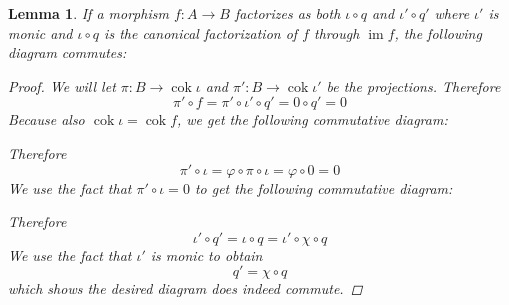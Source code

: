 \documentclass{article}
\DeclareMathOperator{\im}{\mathrm{im}}
\DeclareMathOperator{\cok}{\mathrm{cok}}
\newtheorem{lemma}[theorem]{Lemma}
\begin{document}
\begin{lemma}\label{lem:double factorization through im}
    If a morphism $f:A\to B$ factorizes as both $\iota \circ q$ and $\iota'\circ q'$ where $\iota'$ is monic and $\iota \circ q$ is the canonical factorization of $f$ through $\im f$, the following diagram commutes:
    \begin{center}
    \end{center}
    \cite{FIT}
    \begin{proof}
        We will let $\pi:B\to \cok \iota$ and $\pi':B\to \cok \iota'$ be the projections. Therefore
        \[
        \pi'\circ f=\pi'\circ \iota'\circ q'=0\circ q'=0
        \]
        Because also $\cok \iota=\cok f$, we get the following commutative diagram:
        \begin{center}
        \end{center}
        Therefore
        \[
        \pi'\circ \iota =\varphi \circ \pi \circ \iota=\varphi \circ 0=0
        \]
        We use the fact that $\pi'\circ \iota=0$ to get the following commutative diagram:
        \begin{center}
        \end{center}
         Therefore
        \[
        \iota'\circ q'=\iota \circ q=\iota' \circ \chi \circ q
        \]
        We use the fact that $\iota'$ is monic to obtain
        \[
        q'=\chi \circ q
        \]
        which shows the desired diagram does indeed commute.
    \end{proof}
\end{lemma}
\end{document}
